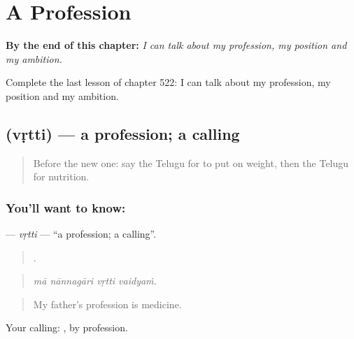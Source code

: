 
\chapter{A Profession}
\label{ch:te-a-profession}

\begin{chapteropening}
\textbf{By the end of this chapter:} \emph{I can talk about my profession, my position and my ambition.}

Complete the last lesson of chapter 522: I can talk about my profession, my position and my ambition.
\end{chapteropening}

\section[\texorpdfstring{\te{వృత్తి} (vṛtti)}{వృత్తి (vṛtti)}]{ (vṛtti) — a profession; a calling}

\label{lesson:TE-C522-vrtti}



\begin{quote}
Before the new one: say the Telugu for to put on weight, then the Telugu for nutrition.
\end{quote}

\subsection*{You'll want to know: }
\textbf{} — \emph{vṛtti} — \textquotedblleft{}a profession; a calling\textquotedblright{}.

\begin{quote}
   .
\end{quote}

\begin{quote}
\emph{mā nānnagāri vṛtti vaidyaṁ.}
\end{quote}

\begin{quote}
My father's profession is medicine.
\end{quote}

Your calling: , by profession.

